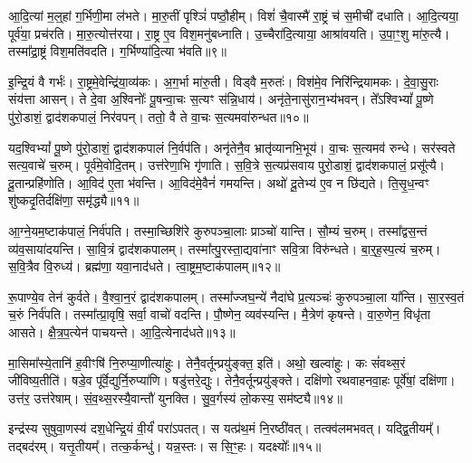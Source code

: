 आ॒दि॒त्यां म॒ल्॒हां ग॒र्भिणी॒मा ल॑भते।
मा॒रु॒तीं पृश्ञिं॑ पष्ठौ॒हीम्।
विशं॑ चै॒वास्मै॑ रा॒ष्ट्रं च॑ स॒मीची॑ दधाति।
आ॒दि॒त्यया॒ पूर्व॑या॒ प्रच॑रति।
मा॒रु॒त्योत्त॑रया।
रा॒ष्ट्र ए॒व विश॒मनु॑बध्नाति।
उ॒च्चैरा॑दि॒त्याया॒ आश्रा॑वयति।
उ॒पा॒ꣳ॒शु मा॑रु॒त्यै।
तस्मा᳚द्रा॒ष्ट्रं विश॒मति॑वदति।
ग॒र्भिण्या॑दि॒त्या भ॑वति॥९॥

इ॒न्द्रि॒यं वै गर्भः॑।
रा॒ष्ट्रमे॒वेन्द्रि॑या॒व्य॑कः।
अ॒ग॒र्भा मा॑रु॒ती।
विड्वै म॒रुतः॑।
विश॑मे॒व निरि॑न्द्रियामकः।
दे॒वा॒सु॒राः संय॑त्ता आसन्।
ते दे॒वा अ॒श्विनोः᳚ पू॒षन्वा॒चः स॒त्यꣳ स॑न्नि॒धाय॑।
अनृ॑ते॒नासु॑रान॒भ्य॑भवन्।
ते᳚ऽश्विभ्यां᳚ पू॒ष्णे पु॑रो॒डाशं॒ द्वाद॑शकपालं॒ निर॑वपन्।
ततो॒ वै ते वा॒चः स॒त्यमवा॑रुन्धत॥१०॥

यद॒श्विभ्यां᳚ पू॒ष्णे पु॑रो॒डाशं॒ द्वाद॑शकपालं नि॒र्वप॑ति।
अनृ॑तेनै॒व भ्रातृ॑व्यानभि॒भूय॑।
वा॒चः स॒त्यमव॑ रुन्धे।
सर॑स्वते सत्य॒वाचे॑ च॒रुम्।
पूर्व॑मे॒वोदि॒तम्।
उत्त॑रेणा॒भि गृ॑णाति।
स॒वि॒त्रे स॒त्यप्र॑सवाय पुरो॒डाशं॒ द्वाद॑शकपालं॒ प्रसू᳚त्यै।
दू॒तान्प्रहि॑णोति।
आ॒विद॑ ए॒ता भ॑वन्ति।
आ॒विद॑मे॒वैनं॑ गमयन्ति।
अथो॑ दू॒तेभ्य॑ ए॒व न छि॑द्यते।
ति॒सृ॒ध॒न्वꣳ शु॑ष्कदृ॒तिर्दक्षि॑णा॒ समृ॑द्ध्यै॥११॥\anuvakamend[अ॒र्ध॒य॒ति॒ भ॒व॒त्य॒रु॒न्ध॒त॒ ग॒म॒य॒न्ति॒ द्वे च॑]

आ॒ग्ने॒यम॒ष्टा\-क॑पालं॒ निर्व॑पति।
तस्मा॒च्छिशि॑रे कुरुपञ्चा॒लाः प्राञ्चो॑ यान्ति।
सौ॒म्यं च॒रुम्।
तस्मा᳚द्वस॒न्तं व्य॑व॒साया॑दयन्ति।
सा॒वि॒त्रं द्वाद॑शकपालम्।
तस्मा᳚त्पु॒रस्ता॒द्यवा॑नाꣳ सवि॒त्रा विरु॑न्धते।
बा॒र्॒ह॒स्प॒त्यं च॒रुम्।
स॒वि॒त्रैव वि॒रुध्य॑।
ब्रह्म॑णा॒ यवा॒नाद॑धते।
त्वा॒ष्ट्रम॒ष्टा\-क॑पालम्॥१२॥

रू॒पाण्ये॒व तेन॑ कुर्वते।
वै॒श्वा॒न॒रं द्वाद॑शकपालम्।
तस्मा᳚ज्जघ॒न्ये॑ नैदा॑घे प्र॒त्यञ्चः॑ कुरुपञ्चा॒ला या᳚न्ति।
सा॒र॒स्व॒तं च॒रुं निर्व॑पति।
तस्मा᳚त्प्रा॒वृषि॒ सर्वा॒ वाचो॑ वदन्ति।
पौ॒ष्णेन॒ व्यव॑स्यन्ति।
मै॒त्रेण॑ कृषन्ते।
वा॒रु॒णेन॒ विधृ॑ता आसते।
क्षै॒त्र॒प॒त्येन॑ पाचयन्ते।
आ॒दि॒त्येनाद॑धते॥१३॥

मा॒सिमा᳚स्ये॒तानि॑ ह॒वीꣳषि॑ नि॒रुप्या॒णीत्या॑हुः।
तेनै॒वर्तून्प्रयु॑ङ्क्त॒ इति॑।
अथो॒ खल्वा॑हुः।
कः सं॑वथ्स॒रं जी॑विष्य॒तीति॑।
षडे॒व पू᳚र्वे॒द्युर्नि॒रुप्या॑णि।
षडु॑त्तरे॒द्युः।
तेनै॒वर्तून्प्रयु॑ङ्क्ते।
दक्षि॑णो रथवाहनवा॒हः पूर्वे॑षां॒ दक्षि॑णा।
उत्त॑र॒ उत्त॑रेषाम्।
सं॒व॒थ्स॒रस्यै॒वान्तौ॑ युनक्ति।
सु॒व॒र्गस्य॑ लो॒कस्य॒ सम॑ष्ट्यै॥१४॥\anuvakamend[त्वा॒ष्ट्रम॒ष्टा\-क॑पालं दधते युन॒क्त्येकं॑ च]

इन्द्र॑स्य सुषुवा॒णस्य॑ दश॒धेन्द्रि॒यं वी॒र्यं॑ परा॑\-ऽपतत्।
स यत्प्र॑थ॒मं नि॒रष्ठी॑वत्।
तत्क्व॑लमभवत्।
यद्द्वि॒तीयम्᳚।
तद्बद॑रम्।
यत्तृ॒तीयम्᳚।
तत्क॒र्कन्धु॑।
यन्न॒स्तः।
स सि॒ꣳ॒हः।
यदक्ष्योः᳚॥१५॥

